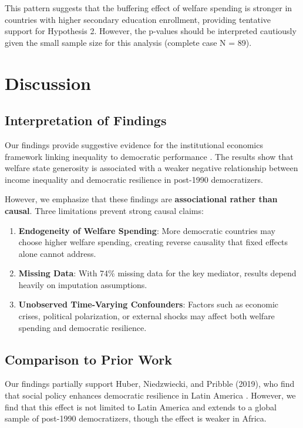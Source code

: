 \documentclass[11pt,letterpaper]{article}
\begin{document}
This pattern suggests that the buffering effect of welfare spending is stronger in countries with higher secondary education enrollment, providing tentative support for Hypothesis 2. However, the p-values should be interpreted cautiously given the small sample size for this analysis (complete case N = 89).

\section{Discussion}

\subsection{Interpretation of Findings}

Our findings provide suggestive evidence for the institutional economics framework linking inequality to democratic performance \cite{Acemoglu2019}. The results show that welfare state generosity is associated with a weaker negative relationship between income inequality and democratic resilience in post-1990 democratizers.

However, we emphasize that these findings are \textbf{associational rather than causal}. Three limitations prevent strong causal claims:

\begin{enumerate}
  \item \textbf{Endogeneity of Welfare Spending}: More democratic countries may choose higher welfare spending, creating reverse causality that fixed effects alone cannot address.
  \item \textbf{Missing Data}: With 74\% missing data for the key mediator, results depend heavily on imputation assumptions.
  \item \textbf{Unobserved Time-Varying Confounders}: Factors such as economic crises, political polarization, or external shocks may affect both welfare spending and democratic resilience.
\end{enumerate}

\subsection{Comparison to Prior Work}

Our findings partially support Huber, Niedzwiecki, and Pribble (2019), who find that social policy enhances democratic resilience in Latin America \cite{Huber2019}. However, we find that this effect is not limited to Latin America and extends to a global sample of post-1990 democratizers, though the effect is weaker in Africa.
\end{document}
